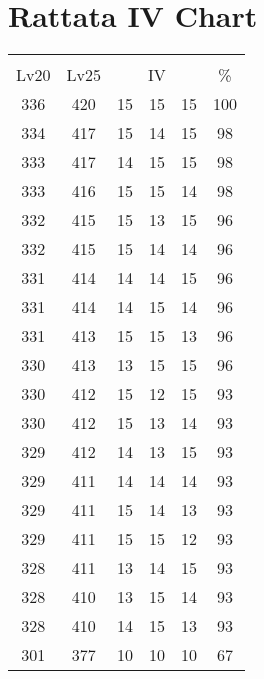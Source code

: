 \documentclass{article}%
\begin{document}
%
\normalsize%
\section{Rattata IV Chart}%
\label{sec:Rattata IV Chart}%
\renewcommand{\arraystretch}{1.5}%
\begin{tabular}{|c|c|c|c|c|c|}%
\hline%
\multicolumn{6}{|c|}{\textcolor{white}{ 
\linebreak{Rattata}
}%
\cellcolor{black}}\\%
\multicolumn{1}{|c}{Lv20}&\multicolumn{1}{c|}{Lv25}&\multicolumn{3}{c|}{IV}&\multicolumn{1}{|c|}{\%}\\%
\hline%
\rowcolor{color100}%
336&420&15&15&15&100\\%
\hline%
\rowcolor{color98}%
334&417&15&14&15&98\\%
\hline%
\rowcolor{color98}%
333&417&14&15&15&98\\%
\hline%
\rowcolor{color98}%
333&416&15&15&14&98\\%
\hline%
\rowcolor{color96}%
332&415&15&13&15&96\\%
\hline%
\rowcolor{color96}%
332&415&15&14&14&96\\%
\hline%
\rowcolor{color96}%
331&414&14&14&15&96\\%
\hline%
\rowcolor{color96}%
331&414&14&15&14&96\\%
\hline%
\rowcolor{color96}%
331&413&15&15&13&96\\%
\hline%
\rowcolor{color96}%
330&413&13&15&15&96\\%
\hline%
\rowcolor{color93}%
330&412&15&12&15&93\\%
\hline%
\rowcolor{color93}%
330&412&15&13&14&93\\%
\hline%
\rowcolor{color93}%
329&412&14&13&15&93\\%
\hline%
\rowcolor{color93}%
329&411&14&14&14&93\\%
\hline%
\rowcolor{color93}%
329&411&15&14&13&93\\%
\hline%
\rowcolor{color93}%
329&411&15&15&12&93\\%
\hline%
\rowcolor{color93}%
328&411&13&14&15&93\\%
\hline%
\rowcolor{color93}%
328&410&13&15&14&93\\%
\hline%
\rowcolor{color93}%
328&410&14&15&13&93\\%
\hline%
\rowcolor{color91}%
301&377&10&10&10&67\\%
\end{tabular}

%
\end{document}
